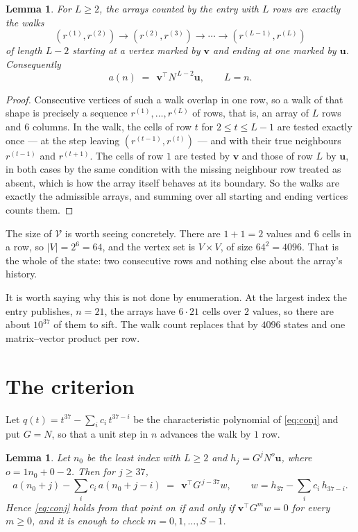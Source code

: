 \documentclass[11pt,a4paper]{article}
\theoremstyle{plain}
\newtheorem{lemma}[theorem]{Lemma}
\theoremstyle{definition}
\begin{document}
\begin{lemma}\label{lem:walk}
For $L\ge2$, the arrays counted by the entry with $L$ rows are exactly the walks
\[
(r^{(1)},r^{(2)})\to(r^{(2)},r^{(3)})\to\cdots\to(r^{(L-1)},r^{(L)})
\]
of length $L-2$ starting at a vertex marked by $\mathbf{v}$ and ending at one marked by
$\mathbf{u}$. Consequently
\[
a(n)\;=\;\,\mathbf{v}^{\!\top}N^{\,L-2}\mathbf{u},\qquad L=n .
\]
\end{lemma}

\begin{proof}
Consecutive vertices of such a walk overlap in one row, so a walk of that shape is
precisely a sequence $r^{(1)},\dots,r^{(L)}$ of rows, that is, an array of $L$ rows
and $6$ columns. In the walk, the cells of row $t$ for $2\le t\le L-1$ are tested
exactly once --- at the step leaving $(r^{(t-1)},r^{(t)})$ --- and with their true
neighbours $r^{(t-1)}$ and $r^{(t+1)}$. The cells of row $1$ are tested by
$\mathbf{v}$ and those of row $L$ by $\mathbf{u}$, in both cases by the same condition
with the missing neighbour row treated as absent, which is how the array itself behaves at
its boundary. So the walks are exactly the admissible arrays, and summing over all starting
and ending vertices counts them.
\end{proof}


The size of $\mathcal V$ is worth seeing concretely. There are $1+1=2$ values
and $6$ cells in a row, so $|V|=2^{6}=64$, and the vertex set is
$V\times V$, of size $64^2=4096$. That is the whole of the state: two consecutive
rows and nothing else about the array's history.

It is worth saying why this is not done by enumeration. At the largest index the entry
publishes, $n=21$, the arrays have $6\cdot21$ cells over
$2$ values, so there are about $10^{37}$ of them to sift. The
walk count replaces that by $4096$ states and one matrix--vector product per row.
\section{The criterion}

Let $q(t)=t^{37}-\sum_i c_i\,t^{37-i}$ be the characteristic polynomial of
\eqref{eq:conj} and put $G=N$, so that a unit step in $n$ advances the walk by
$1$ row.

\begin{lemma}\label{lem:crit}
Let $n_0$ be the least index with $L\ge2$ and $h_j=G^{j}N^{o}\mathbf{u}$, where
$o=1n_0+0-2$. Then for $j\ge37$,
\[
a(n_0+j)-\sum_i c_i\,a(n_0+j-i)\;=\;\,\mathbf{v}^{\!\top}G^{\,j-37}w,
\qquad w=h_{37}-\sum_i c_i\,h_{37-i} .
\]
Hence \eqref{eq:conj} holds from that point on if and only if
$\mathbf{v}^{\!\top}G^{m}w=0$ for every $m\ge0$, and it is enough to check
$m=0,1,\dots,S-1$.
\end{lemma}
\end{document}
